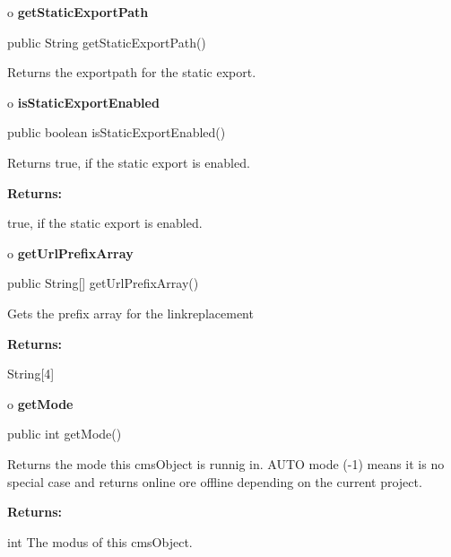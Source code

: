 o {\bf getStaticExportPath} 

\begin{PRE}
 public String getStaticExportPath()
\end{PRE}

\begin{description}
\htmlDD Returns the exportpath for the static export. 

\end{description}

o {\bf isStaticExportEnabled} 

\begin{PRE}
 public boolean isStaticExportEnabled()
\end{PRE}

\begin{description}
\htmlDD Returns true, if the static export is enabled. 

\begin{description}
\item {\bf Returns:}  

true, if the static export is enabled.  
\end{description}

\end{description}

o {\bf getUrlPrefixArray} 

\begin{PRE}
 public String[] getUrlPrefixArray()
\end{PRE}

\begin{description}
\htmlDD Gets the prefix array for the linkreplacement 

\begin{description}
\item {\bf Returns:}  

String[4]  
\end{description}

\end{description}

o {\bf getMode} 

\begin{PRE}
 public int getMode()
\end{PRE}

\begin{description}
\htmlDD Returns the mode this cmsObject is runnig in. AUTO mode (-1) means it
is no special case and returns online ore offline depending on the current
project. 

\begin{description}
\item {\bf Returns:}  

int The modus of this cmsObject.  
\end{description}

\end{description}


